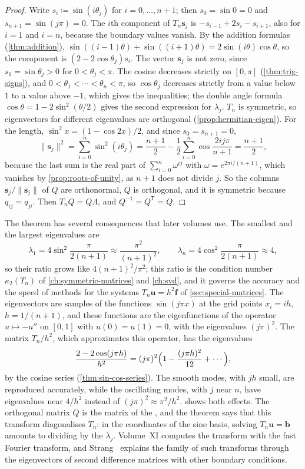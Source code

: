 \begin{proof}
Write $s_i\coloneqq\sin(i\theta_j)$ for $i=0,\ldots,n+1$; then $s_0=\sin0=0$ and $s_{n+1}=\sin(j\pi)=0$. The $i$th component of $T_n\mathbf s_j$ is $-s_{i-1}+2s_i-s_{i+1}$, also for $i=1$ and $i=n$, because the boundary values vanish. By the addition formulas (\cref{thm:addition}), $\sin((i-1)\theta)+\sin((i+1)\theta)=2\sin(i\theta)\cos\theta$, so the component is $(2-2\cos\theta_j)s_i$. The vector $\mathbf s_j$ is not zero, since $s_1=\sin\theta_j>0$ for $0<\theta_j<\pi$. The cosine decreases strictly on $[0,\pi]$ (\cref{thm:trig-signs}), and $0<\theta_1<\cdots<\theta_n<\pi$, so $\cos\theta_j$ decreases strictly from a value below $1$ to a value above $-1$, which gives the inequalities; the double angle formula $\cos\theta=1-2\sin^2(\theta/2)$ gives the second expression for $\lambda_j$. $T_n$ is symmetric, so eigenvectors for different eigenvalues are orthogonal (\cref{prop:hermitian-eigen}). For the length, $\sin^2x=(1-\cos2x)/2$, and since $s_0=s_{n+1}=0$,
\[
\|\mathbf s_j\|^2=\sum_{i=0}^{n}\sin^2(i\theta_j)=\frac{n+1}2-\frac12\sum_{i=0}^{n}\cos\frac{2ij\pi}{n+1}=\frac{n+1}2,
\]
because the last sum is the real part of $\sum_{i=0}^n\omega^{ij}$ with $\omega=e^{2\pi i/(n+1)}$, which vanishes by \cref{prop:roots-of-unity}, as $n+1$ does not divide $j$. So the columns $\mathbf s_j/\|\mathbf s_j\|$ of $Q$ are orthonormal, $Q$ is orthogonal, and it is symmetric because $q_{ij}=q_{ji}$. Then $T_nQ=Q\Lambda$, and $Q^{-1}=Q^{\mathsf T}=Q$.
\end{proof}

The theorem has several consequences that later volumes use. The smallest and the largest eigenvalues are
\[
\lambda_1=4\sin^2\frac{\pi}{2(n+1)}\approx\frac{\pi^2}{(n+1)^2},\qquad\lambda_n=4\cos^2\frac{\pi}{2(n+1)}\approx4,
\]
so their ratio grows like $4(n+1)^2/\pi^2$; this ratio is the condition number $\kappa_2(T_n)$ of \cref{ch:symmetric-matrices} and \cref{ch:svd}, and it governs the accuracy and the speed of methods for the systems $T_n\mathbf u=h^2\mathbf f$ of \cref{sec:special-matrices}. The eigenvectors are samples of the functions $\sin(j\pi x)$ at the grid points $x_i=ih$, $h=1/(n+1)$, and these functions are the eigenfunctions of the operator $u\mapsto-u''$ on $[0,1]$ with $u(0)=u(1)=0$, with the eigenvalues $(j\pi)^2$. The matrix $T_n/h^2$, which approximates this operator, has the eigenvalues
\[
\frac{2-2\cos(j\pi h)}{h^2}=(j\pi)^2\Bigl(1-\frac{(j\pi h)^2}{12}+\cdots\Bigr),
\]
by the cosine series (\cref{thm:sin-cos-series}). The smooth modes, with $jh$ small, are reproduced accurately, while the oscillating modes, with $j$ near $n$, have eigenvalues near $4/h^2$ instead of $(j\pi)^2\approx\pi^2/h^2$.  shows both effects. The orthogonal matrix $Q$ is the matrix of the , and the theorem says that this transform diagonalises $T_n$: in the coordinates of the sine basis, solving $T_n\mathbf u=\mathbf b$ amounts to dividing by the $\lambda_j$. Volume~XI computes the transform with the fast Fourier transform, and Strang~\cite{strang1999dct} explains the family of such transforms through the eigenvectors of second difference matrices with other boundary conditions.

